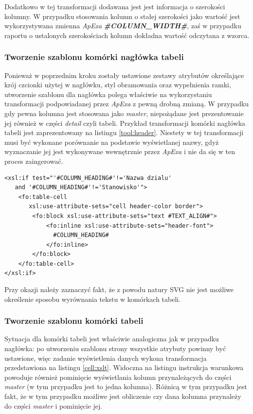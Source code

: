 \documentclass[11pt,a4paper]{article}
\begin{document}
Dodatkowo w tej transformacji dodawana jest jest informacja o szerokości kolumny. W przypadku stosowania kolumn o stałej szerokości jako wartość jest wykorzystywana zmienna \emph{ApExa} \textbf{\emph{\#COLUMN\_WIDTH\#}}, zaś w przypadku raportu o ustalonych szerokościach kolumn dokładna wartość odczytana z wzorca.


\subsubsection{Tworzenie szablonu komórki nagłówka tabeli} \label{table:header}
Ponieważ w poprzednim kroku zostały ustawione zestawy atrybutów określające krój czcionki użytej w nagłówku, styl obramowania oraz wypełnienia ramki, utworzenie szablonu dla nagłówka polega właściwie na wykorzystaniu transformacji podpowiadanej przez \emph{ApExa} z pewną drobną zmianą. W przypadku gdy pewna kolumna jest stosowana jako \emph{master}, niepożądane jest prezentowanie jej również w części \emph{detail} czyli tabeli. Przykład transformacji komórki nagłówka tabeli jest zaprezentowany na listingu \ref{tool:header}. Niestety w tej transformacji musi być wykonane porównanie na podstawie wyświetlanej nazwy, gdyż wyznaczanie jej jest wykonywane wewnętrznie przez \emph{ApExa} i nie da się w ten proces zaingerować.

\lstset{language=XSLT}
\begin{lstlisting}[frame=single,caption=Transformacja dla nagłówka tabeli, label=tool:header]
<xsl:if test="'#COLUMN_HEADING#'!='Nazwa dzialu' 
   and '#COLUMN_HEADING#'!='Stanowisko'">
    <fo:table-cell 
       xsl:use-attribute-sets="cell header-color border">
        <fo:block xsl:use-attribute-sets="text #TEXT_ALIGN#">
            <fo:inline xsl:use-attribute-sets="header-font">
              #COLUMN_HEADING#
            </fo:inline>
        </fo:block>
    </fo:table-cell>
</xsl:if>

\end{lstlisting}

Przy okazji należy zaznaczyć fakt, że z powodu natury SVG nie jest możliwe określenie sposobu wyrównania tekstu w komórkach tabeli. 

\subsubsection{Tworzenie szablonu komórki tabeli}
Sytuacja dla komórki tabeli jest właściwie analogiczna jak w przypadku nagłówka: po utworzeniu szablonu strony wszystkie atrybuty powinny być ustawione, więc zadanie wyświetlenia danych wykona transformacja przedstawiona na listingu \ref{cell:xslt}. Widoczna na listingu instrukcja warunkowa powoduje również pominięcie wyświetlania kolumn przynależących do części \emph{master} (w tym przypadku jest to jedna kolumna). Różnicą w tym przypadku jest fakt, że w tym przypadku możliwe jest obliczenie czy dana kolumna przynależy do części \emph{master} i pominięcie jej. 
\end{document}
